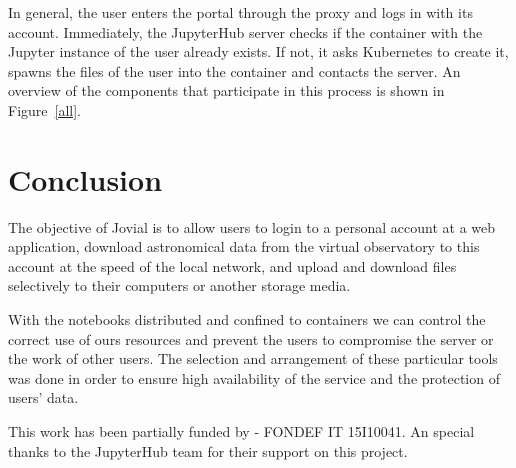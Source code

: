 \documentclass[11pt,twoside]{article}
\begin{document}
In general, the user enters the portal through the proxy and logs in with its account. Immediately, the JupyterHub server checks if the container with the Jupyter instance of the user already exists. If not, it asks Kubernetes to create it, spawns the files of the user into the container and contacts the server. An overview of the components that participate in this process is shown in Figure~\ref{all}.

% 


\section{Conclusion}

The objective of Jovial is to allow users to login to a personal account at a web application, download astronomical data from the virtual observatory to this account at the speed of the local network, and upload and download files selectively to their computers or another storage media.

With the notebooks distributed and confined to containers we can control the correct use of ours resources and prevent the users to compromise the server or the work of other users. 
The selection and arrangement of these particular tools was done in order to ensure high availability of the service and the protection of users' data. 

\acknowledgments This work has been partially funded by - FONDEF IT 15I10041. An special thanks to the JupyterHub team for their support on this project.
\end{document}
